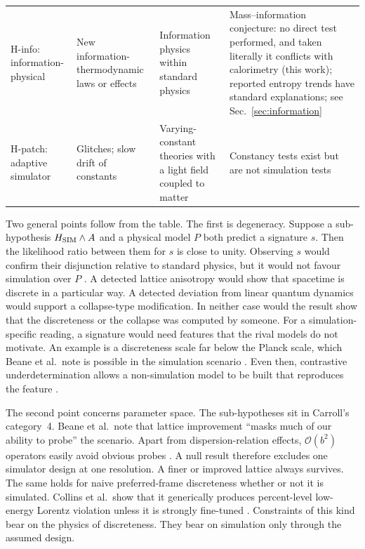\begin{table}[t]
\begin{tabular}{p{}p{}p{}p{}}
H-info: information-physical & New information-thermodynamic laws or effects & Information physics within standard physics \cite{Lloyd2002computational} & Mass--information conjecture: no direct test performed, and taken literally it conflicts with calorimetry (this work); reported entropy trends have standard explanations; see Sec.~\ref{sec:information} \\
H-patch: adaptive simulator & Glitches; slow drift of constants \cite{Barrow2007living} & Varying-constant theories with a light field coupled to matter \cite{Uzan2011varying} & Constancy tests exist but are not simulation tests \cite{Uzan2011varying} \\
\hline
\end{tabular}
\end{table}

Two general points follow from the table. The first is degeneracy. Suppose a
sub-hypothesis $H_{\rm SIM}\wedge A$ and a physical model $P$ both predict a
signature $s$. Then the likelihood ratio between them for $s$ is close to
unity. Observing $s$ would confirm their disjunction relative to standard
physics, but it would not favour simulation over $P$
\cite{Crupi2025confirmation}. A detected lattice anisotropy would show that
spacetime is discrete in a particular way. A detected deviation from
linear quantum dynamics would support a collapse-type modification. In
neither case would the result show that the discreteness or the collapse was
computed by someone. For a simulation-specific reading, a signature would need
features that the rival models do not motivate. An example is a
discreteness scale far below the Planck scale, which Beane et al.\ note is
possible in the simulation scenario \cite{Beane2014constraints}. Even then,
contrastive underdetermination allows a non-simulation model to be built that
reproduces the feature \cite{Stanford2023underdetermination}.

The second point concerns parameter space. The sub-hypotheses sit in Carroll's
category~4. Beane et al.\ note that lattice improvement ``masks much of our
ability to probe'' the scenario. Apart from dispersion-relation effects,
$\mathcal{O}(b^2)$ operators easily avoid obvious probes
\cite{Beane2014constraints}. A null result therefore excludes one simulator
design at one resolution. A finer or improved lattice always survives. The
same holds for naive preferred-frame discreteness whether or not it is
simulated. Collins et al.\ show that it generically produces percent-level
low-energy Lorentz violation unless it is strongly fine-tuned
\cite{Collins2004lorentz}. Constraints of this kind bear on the physics of
discreteness. They bear on simulation only through the assumed design.

